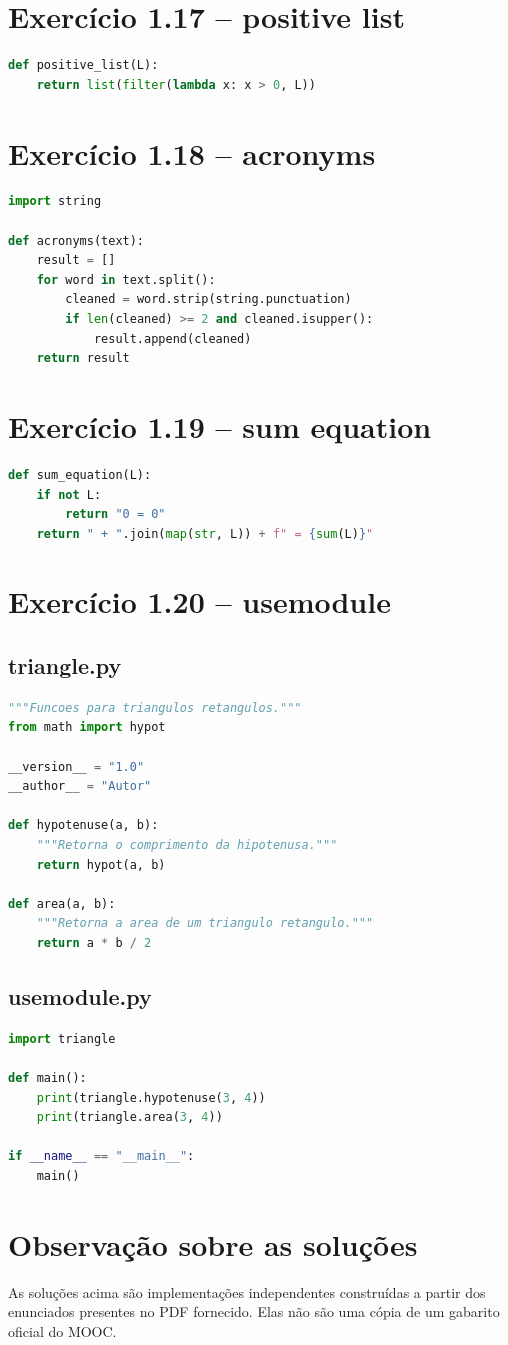 \documentclass[11pt,a4paper]{article}
\begin{document}
\section{Exercício 1.17 -- positive list}
\begin{lstlisting}[language=Python]
def positive_list(L):
    return list(filter(lambda x: x > 0, L))
\end{lstlisting}

\section{Exercício 1.18 -- acronyms}
\begin{lstlisting}[language=Python]
import string

def acronyms(text):
    result = []
    for word in text.split():
        cleaned = word.strip(string.punctuation)
        if len(cleaned) >= 2 and cleaned.isupper():
            result.append(cleaned)
    return result
\end{lstlisting}

\section{Exercício 1.19 -- sum equation}
\begin{lstlisting}[language=Python]
def sum_equation(L):
    if not L:
        return "0 = 0"
    return " + ".join(map(str, L)) + f" = {sum(L)}"
\end{lstlisting}

\section{Exercício 1.20 -- usemodule}
\subsection*{triangle.py}
\begin{lstlisting}[language=Python]
"""Funcoes para triangulos retangulos."""
from math import hypot

__version__ = "1.0"
__author__ = "Autor"

def hypotenuse(a, b):
    """Retorna o comprimento da hipotenusa."""
    return hypot(a, b)

def area(a, b):
    """Retorna a area de um triangulo retangulo."""
    return a * b / 2
\end{lstlisting}

\subsection*{usemodule.py}
\begin{lstlisting}[language=Python]
import triangle

def main():
    print(triangle.hypotenuse(3, 4))
    print(triangle.area(3, 4))

if __name__ == "__main__":
    main()
\end{lstlisting}

\section{Observação sobre as soluções}
As soluções acima são implementações independentes construídas a partir dos enunciados presentes no PDF fornecido. Elas não são uma cópia de um gabarito oficial do MOOC.
\end{document}
